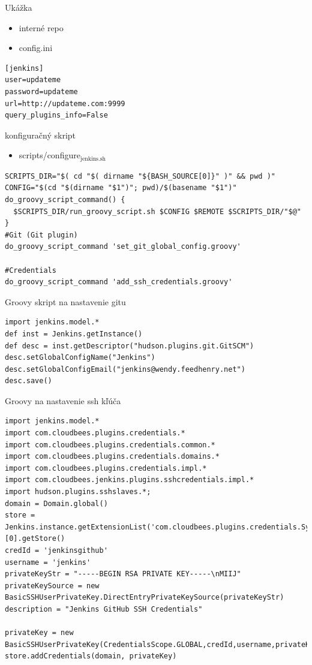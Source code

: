 \documentclass[bigger]{beamer}
\begin{document}
\begin{frame}[fragile,label={sec:orga8188a2}]{Ukážka}
 \begin{itemize}
\item interné repo
\item config.ini
\end{itemize}
\begin{verbatim}
[jenkins]
user=updateme
password=updateme
url=http://updateme.com:9999
query_plugins_info=False
\end{verbatim}
\end{frame}
\begin{frame}[fragile,label={sec:org3c14a90}]{konfiguračný skript}
 \begin{itemize}
\item scripts/configure\(_{\text{jenkins.sh}}\)
\end{itemize}
\begin{verbatim}
SCRIPTS_DIR="$( cd "$( dirname "${BASH_SOURCE[0]}" )" && pwd )"
CONFIG="$(cd "$(dirname "$1")"; pwd)/$(basename "$1")"
do_groovy_script_command() {
  $SCRIPTS_DIR/run_groovy_script.sh $CONFIG $REMOTE $SCRIPTS_DIR/"$@"
}
#Git (Git plugin)
do_groovy_script_command 'set_git_global_config.groovy'

#Credentials
do_groovy_script_command 'add_ssh_credentials.groovy'
\end{verbatim}
\end{frame}
\begin{frame}[fragile,label={sec:org4277a6c}]{Groovy skript na nastavenie gitu}
 \begin{verbatim}
import jenkins.model.*
def inst = Jenkins.getInstance()
def desc = inst.getDescriptor("hudson.plugins.git.GitSCM")
desc.setGlobalConfigName("Jenkins")
desc.setGlobalConfigEmail("jenkins@wendy.feedhenry.net")
desc.save()
\end{verbatim}
\end{frame}
\begin{frame}[fragile,label={sec:orgc76a8f4}]{Groovy na nastavenie ssh kľúča}
 \begin{verbatim}
import jenkins.model.*
import com.cloudbees.plugins.credentials.*
import com.cloudbees.plugins.credentials.common.*
import com.cloudbees.plugins.credentials.domains.*
import com.cloudbees.plugins.credentials.impl.*
import com.cloudbees.jenkins.plugins.sshcredentials.impl.*
import hudson.plugins.sshslaves.*;
domain = Domain.global()
store = Jenkins.instance.getExtensionList('com.cloudbees.plugins.credentials.SystemCredentialsProvider')[0].getStore()
credId = 'jenkinsgithub'
username = 'jenkins'
privateKeyStr = "-----BEGIN RSA PRIVATE KEY-----\nMIIJ"
privateKeySource = new BasicSSHUserPrivateKey.DirectEntryPrivateKeySource(privateKeyStr)
description = "Jenkins GitHub SSH Credentials"

privateKey = new BasicSSHUserPrivateKey(CredentialsScope.GLOBAL,credId,username,privateKeySource,"",description)
store.addCredentials(domain, privateKey)
\end{verbatim}
\end{frame}
\end{document}
